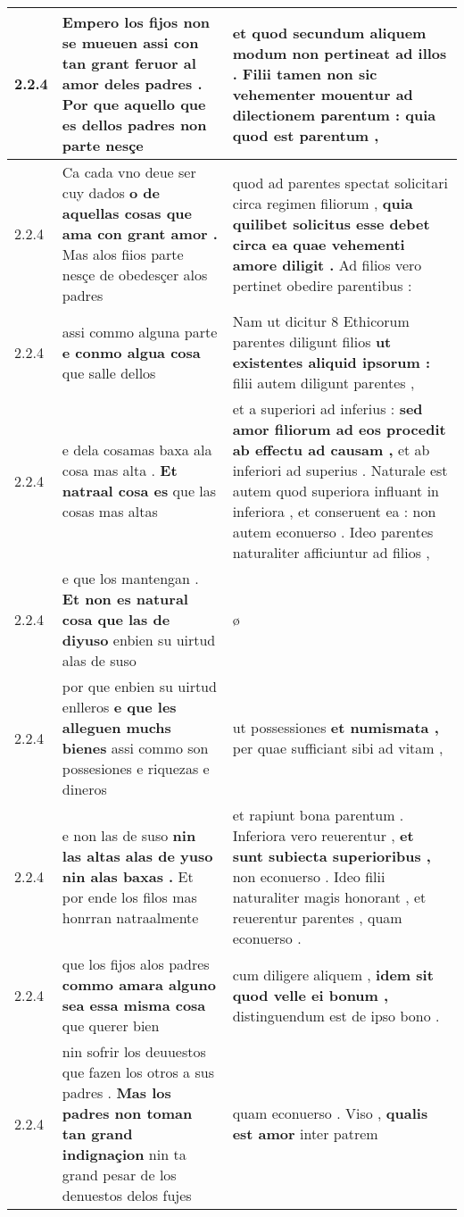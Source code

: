\begin{tabular}{|p{1cm}|p{6.5cm}|p{6.5cm}|}
2.2.4 & Empero los fijos non se mueuen \textbf{ assi con tan grant feruor al amor deles padres . } Por que aquello que es dellos padres non parte nesçe & et quod \textbf{ secundum aliquem modum non pertineat ad illos . Filii tamen non sic vehementer mouentur ad dilectionem parentum : } quia quod est parentum , \\\hline
2.2.4 & Ca cada vno deue ser cuy dados \textbf{ o de aquellas cosas que ama con grant amor . } Mas alos fiios parte nesçe de obedesçer alos padres & quod ad parentes spectat solicitari circa regimen filiorum , \textbf{ quia quilibet solicitus esse debet circa ea quae vehementi amore diligit . } Ad filios vero pertinet obedire parentibus : \\\hline
2.2.4 & assi commo alguna parte \textbf{ e conmo algua cosa } que salle dellos & Nam ut dicitur 8 Ethicorum parentes diligunt filios \textbf{ ut existentes aliquid ipsorum : } filii autem diligunt parentes , \\\hline
2.2.4 & e dela cosamas baxa ala cosa mas alta . \textbf{ Et natraal cosa es } que las cosas mas altas & et a superiori ad inferius : \textbf{ sed amor filiorum ad eos procedit ab effectu ad causam , } et ab inferiori ad superius . Naturale est autem quod superiora influant in inferiora , et conseruent ea : non autem econuerso . Ideo parentes naturaliter afficiuntur ad filios , \\\hline
2.2.4 & e que los mantengan . \textbf{ Et non es natural cosa que las de diyuso } enbien su uirtud alas de suso & ø \\\hline
2.2.4 & por que enbien su uirtud enlleros \textbf{ e que les alleguen muchs bienes } assi commo son possesiones e riquezas e dineros & ut possessiones \textbf{ et numismata , } per quae sufficiant sibi ad vitam , \\\hline
2.2.4 & e non las de suso \textbf{ nin las altas alas de yuso nin alas baxas . } Et por ende los filos mas honrran natraalmente & et rapiunt bona parentum . Inferiora vero reuerentur , \textbf{ et sunt subiecta superioribus , } non econuerso . Ideo filii naturaliter magis honorant , et reuerentur parentes , quam econuerso . \\\hline
2.2.4 & que los fijos alos padres \textbf{ commo amara alguno sea essa misma cosa } que querer bien & cum diligere aliquem , \textbf{ idem sit quod velle ei bonum , } distinguendum est de ipso bono . \\\hline
2.2.4 & nin sofrir los deuuestos que fazen los otros a sus padres . \textbf{ Mas los padres non toman tan grand indignaçion } nin ta grand pesar de los denuestos delos fujes & quam econuerso . Viso , \textbf{ qualis est amor } inter patrem \\\hline

\end{tabular}
